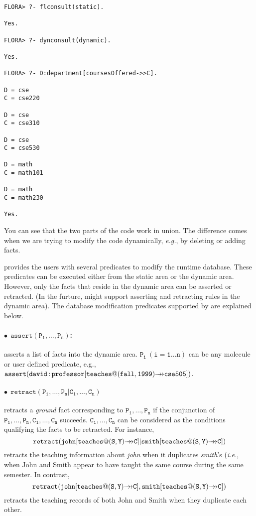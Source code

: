 \documentclass[11pt]{report}
\begin{document}
\begin{verbatim}
FLORA> ?- flconsult(static).

Yes.

FLORA> ?- dynconsult(dynamic).

Yes.

FLORA> ?- D:department[coursesOffered->>C].

D = cse
C = cse220

D = cse
C = cse310

D = cse
C = cse530

D = math
C = math101

D = math
C = math230

Yes.
\end{verbatim}
You can see that the two parts of the code work in union. The difference
comes when we are trying to modify the code dynamically, {\it e.g.}, by
deleting or adding facts.

\FLORA provides the users with several predicates to modify the runtime
database.  These predicates can be executed either from the static area or
the dynamic area. However, only the facts that reside in the dynamic area
can be asserted or retracted. (In the furture, \FLORA might support 
asserting and retracting rules in the dynamic area). The database
modification predicates supported by
\FLORA are explained below.

\paragraph{$\bullet~~\mathtt{assert(P_1,\ldots,P_n)}$:} asserts a list of facts into the dynamic area.
$\mathtt{P_i~(i=1{\ldots}n)}$ can be any \fl molecule or user defined
predicate, e.g.,
$\mathtt{assert(david{\,{\bf{:}}\,}professor[teaches@(fall,1999){{\rightarrow\!\!\!\!\rightarrow}}cse505])}$.

\paragraph{$\bullet~~\mathtt{retract(P_1,\ldots,P_n | C_1,\ldots,C_n)}$}
retracts a \emph{ground} fact corresponding to $\mathtt{P_1,\ldots,P_n}$ if
the conjunction of $\mathtt{P_1,\ldots,P_n,C_1,\ldots,C_n}$ succeeds.
$\mathtt{C_1,\ldots,C_n}$ can be considered as the conditions qualifying
the facts to be retracted.  For instance,
\[
\mathtt{retract(john[teaches@(S,Y){\mvd}C]|smith[teaches@(S,Y){\mvd}C])}
\]
retracts the teaching information about {\it john} when it duplicates {\it
  smith}'s ({\it i.e.}, when John and Smith appear to have taught the same
course during the same semester. In contrast,
\[
\mathtt{retract(john[teaches@(S,Y){\mvd}C],smith[teaches@(S,Y){\mvd}C])}
\]
retracts the teaching records of both John and Smith when they duplicate
each other.
\end{document}
